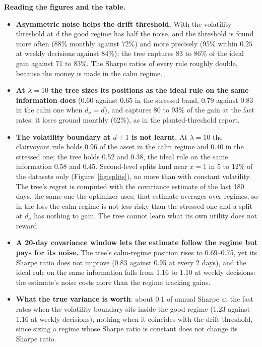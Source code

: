 \documentclass[11pt,a4paper]{article}
\newcommand{\1}{\mathbf{1}}
\begin{document}
\textbf{Reading the figures and the table.}
\begin{itemize}\setlength{\itemsep}{1pt}
\item \textbf{Asymmetric noise helps the drift threshold.} With the volatility threshold at $d$ the good regime has half the noise, and the threshold is found more often (88\% monthly against 72\%) and more precisely (95\% within $0.25$ at weekly decisions against 84\%); the tree captures 83 to 86\% of the ideal gain against 71 to 83\%. The Sharpe ratios of every rule roughly double, because the money is made in the calm regime.
\item \textbf{At $\lambda=10$ the tree sizes its positions as the ideal rule on the same information does} (0.60 against 0.65 in the stressed band, 0.79 against 0.83 in the calm one when $d_\sigma=d$), and captures 80 to 93\% of the gain at the fast rates; it loses ground monthly (62\%), as in the planted-threshold report.
\item \textbf{The volatility boundary at $d+1$ is not learnt.} At $\lambda=10$ the clairvoyant rule holds 0.96 of the asset in the calm regime and 0.40 in the stressed one; the tree holds 0.52 and 0.38, the ideal rule on the same information 0.58 and 0.45. Second-level splits land near $x=1$ in 5 to 12\% of the datasets only (Figure~\ref{fig:splits}), no more than with constant volatility. The tree's regret is computed with the covariance estimate of the last 180 days, the same one the optimizer uses; that estimate averages over regimes, so in the loss the calm regime is not less risky than the stressed one and a split at $d_\sigma$ has nothing to gain. The tree cannot learn what its own utility does not reward.
\item \textbf{A 20-day covariance window lets the estimate follow the regime but pays for its noise.} The tree's calm-regime position rises to 0.69--0.75, yet its Sharpe ratio does not improve (0.83 against 0.95 at every 2 days), and the ideal rule on the same information falls from 1.16 to 1.10 at weekly decisions: the estimate's noise costs more than the regime tracking gains.
\item \textbf{What the true variance is worth}: about 0.1 of annual Sharpe at the fast rates when the volatility boundary sits inside the good regime (1.23 against 1.16 at weekly decisions), nothing when it coincides with the drift threshold, since sizing a regime whose Sharpe ratio is constant does not change its Sharpe ratio.
\end{itemize}
\end{document}
